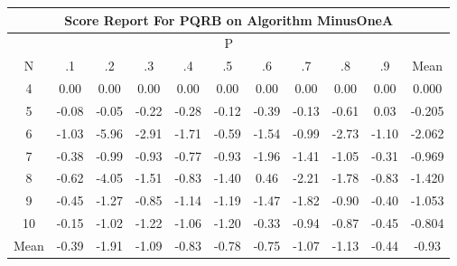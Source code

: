 \documentclass[11pt,a4paper]{report}
\begin{document}
\begin{longtable}{ | c || c | c | c | c | c | c | c | c | c || c |}
\hline
\multicolumn{11}{|c|}{ Score Report For PQRB on Algorithm MinusOneA} \\
\hline
\multicolumn{11}{|c|}{ P } \\
\hline
N & .1 & .2 & .3 & .4 & .5 & .6 & .7 & .8 & .9 & Mean\\
 \hline
 \hline
 \endhead
  4 &  \cellcolor[HTML]{FFFFFF} 0.00 &  \cellcolor[HTML]{FFFFFF} 0.00 &  \cellcolor[HTML]{FFFFFF} 0.00 &  \cellcolor[HTML]{FFFFFF} 0.00 &  \cellcolor[HTML]{FFFFFF} 0.00 &  \cellcolor[HTML]{FFFFFF} 0.00 &  \cellcolor[HTML]{FFFFFF} 0.00 &  \cellcolor[HTML]{FFFFFF} 0.00 &  \cellcolor[HTML]{FFFFFF} 0.00 & 0.000 \\
  5 &  \cellcolor[HTML]{FFFFFF} -0.08 &  \cellcolor[HTML]{FFFFFF} -0.05 &  \cellcolor[HTML]{FFF7F7} -0.22 &  \cellcolor[HTML]{FFF7F7} -0.28 &  \cellcolor[HTML]{FFFFFF} -0.12 &  \cellcolor[HTML]{FFF7F7} -0.39 &  \cellcolor[HTML]{FFFFFF} -0.13 &  \cellcolor[HTML]{FFEFEF} -0.61 &  \cellcolor[HTML]{FFFFFF} 0.03 & -0.205 \\
  6 &  \cellcolor[HTML]{FFE7E7} -1.03 &  \cellcolor[HTML]{FF6868} -5.96 &  \cellcolor[HTML]{FFB7B7} -2.91 &  \cellcolor[HTML]{FFD7D7} -1.71 &  \cellcolor[HTML]{FFEFEF} -0.59 &  \cellcolor[HTML]{FFD7D7} -1.54 &  \cellcolor[HTML]{FFE7E7} -0.99 &  \cellcolor[HTML]{FFB7B7} -2.73 &  \cellcolor[HTML]{FFE7E7} -1.10 & -2.062 \\
  7 &  \cellcolor[HTML]{FFF7F7} -0.38 &  \cellcolor[HTML]{FFE7E7} -0.99 &  \cellcolor[HTML]{FFE7E7} -0.93 &  \cellcolor[HTML]{FFEFEF} -0.77 &  \cellcolor[HTML]{FFE7E7} -0.93 &  \cellcolor[HTML]{FFCFCF} -1.96 &  \cellcolor[HTML]{FFDFDF} -1.41 &  \cellcolor[HTML]{FFE7E7} -1.05 &  \cellcolor[HTML]{FFF7F7} -0.31 & -0.969 \\
  8 &  \cellcolor[HTML]{FFEFEF} -0.62 &  \cellcolor[HTML]{FF9797} -4.05 &  \cellcolor[HTML]{FFD7D7} -1.51 &  \cellcolor[HTML]{FFE7E7} -0.83 &  \cellcolor[HTML]{FFDFDF} -1.40 &  \cellcolor[HTML]{F7F7FF} 0.46 &  \cellcolor[HTML]{FFC7C7} -2.21 &  \cellcolor[HTML]{FFCFCF} -1.78 &  \cellcolor[HTML]{FFE7E7} -0.83 & -1.420 \\
  9 &  \cellcolor[HTML]{FFF7F7} -0.45 &  \cellcolor[HTML]{FFDFDF} -1.27 &  \cellcolor[HTML]{FFE7E7} -0.85 &  \cellcolor[HTML]{FFDFDF} -1.14 &  \cellcolor[HTML]{FFDFDF} -1.19 &  \cellcolor[HTML]{FFD7D7} -1.47 &  \cellcolor[HTML]{FFCFCF} -1.82 &  \cellcolor[HTML]{FFE7E7} -0.90 &  \cellcolor[HTML]{FFF7F7} -0.40 & -1.053 \\
  10 &  \cellcolor[HTML]{FFFFFF} -0.15 &  \cellcolor[HTML]{FFE7E7} -1.02 &  \cellcolor[HTML]{FFDFDF} -1.22 &  \cellcolor[HTML]{FFE7E7} -1.06 &  \cellcolor[HTML]{FFDFDF} -1.20 &  \cellcolor[HTML]{FFF7F7} -0.33 &  \cellcolor[HTML]{FFE7E7} -0.94 &  \cellcolor[HTML]{FFE7E7} -0.87 &  \cellcolor[HTML]{FFF7F7} -0.45 & -0.804 \\
 \hline
 \hline
Mean &  \cellcolor[HTML]{FFF7F7} -0.39 &  \cellcolor[HTML]{FFCFCF} -1.91 &  \cellcolor[HTML]{FFE7E7} -1.09 &  \cellcolor[HTML]{FFE7E7} -0.83 &  \cellcolor[HTML]{FFEFEF} -0.78 &  \cellcolor[HTML]{FFEFEF} -0.75 &  \cellcolor[HTML]{FFE7E7} -1.07 &  \cellcolor[HTML]{FFDFDF} -1.13 &  \cellcolor[HTML]{FFF7F7} -0.44 &  \cellcolor[HTML]{FFE7E7} -0.93
\end{longtable}
\end{document}
